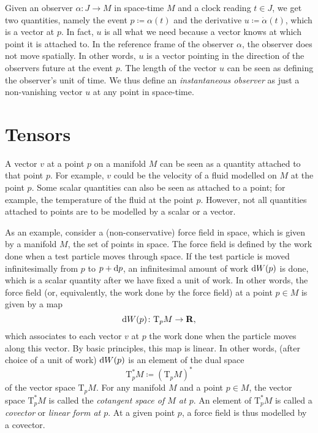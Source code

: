 Given an observer $\alpha\colon J \to M$ in space-time $M$ and a clock reading
$t \in J$, we get two quantities, namely the event $p \coloneqq \alpha(t)$ and the
derivative $u \coloneqq \dot\alpha(t)$, which is a vector at $p$. In fact, $u$
is all what we need because a vector knows at which point it is attached to.
In the reference frame of the observer $\alpha$, the observer does not move spatially.
In other words, $u$ is a vector pointing in the direction of the observers
future at the event $p$. The length of the vector $u$ can be seen as defining
the observer's unit of time. We thus define an \emph{instantaneous observer}
as just a non-vanishing vector $u$ at any point in space-time.

\section{Tensors}

A vector $v$ at a point $p$ on a manifold $M$ can be seen as a quantity attached to
that point $p$. For example, $v$ could be the velocity of a fluid modelled on
$M$ at the point $p$. Some scalar quantities can also be seen as attached to a point;
for example, the temperature of the fluid at the point $p$. However, not all
quantities attached to points are to be modelled by a scalar or a vector.

As an example, consider a (non-conservative) force field in space, which is
given by a manifold $M$, the set of points in space. The force field is defined
by the work done when a test particle moves through space. If the test particle
is moved infinitesimally from $p$ to $p + \mathrm d p$, an infinitesimal amount
of work $\mathrm d W(p)$ is done, which is a scalar quantity after we have fixed a
unit of work. In other words,
the force field (or, equivalently, the work done by the force field) at a point
$p \in M$ is given by a map
\[
  \mathrm d W(p)\colon \mathrm T_p M \to \mathbf{R},
\] 
which associates to each vector $v$ at $p$ the work done when the particle moves
along this vector. By basic principles, this map is linear. In other words,
(after choice of a unit of work) $\mathrm d W(p)$ is an element of the dual space
\[
  \mathrm T^*_p M \coloneqq (\mathrm T_p M)^*
\]
of the vector space $\mathrm T_p M$. For any manifold $M$ and a point $p \in M$,
the vector space $\mathrm T^*_p M$ is called the \emph{cotangent space of $M$
at $p$}. An element of $\mathrm T^*_p M$ is called a \emph{covector} or \emph{linear
form at $p$}. At a given point $p$, a force field is thus modelled by a covector.

